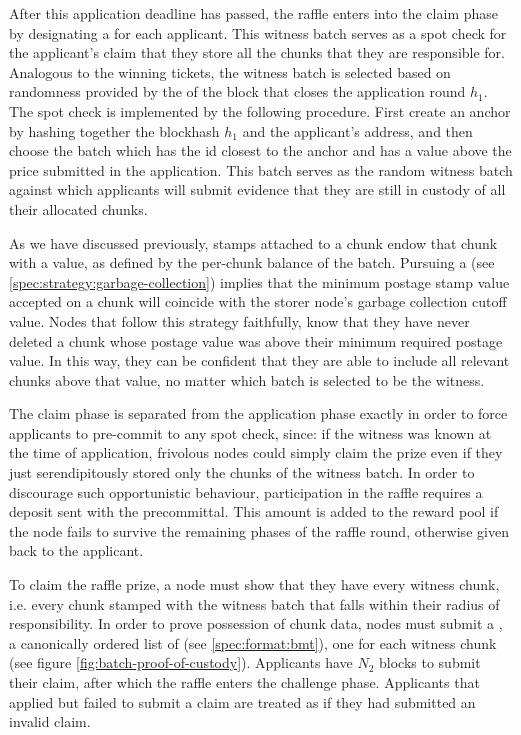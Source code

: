 After this application deadline has passed, the raffle enters into the claim phase by designating a  for each applicant. This witness batch serves as a spot check for the applicant's claim that they store all the chunks that they are responsible for. Analogous to the winning tickets, the witness batch is selected based on randomness provided by the  of the block that closes the application round $h_1$.  The spot check is implemented  by the following procedure. First create an anchor by hashing together the blockhash $h_1$ and the applicant's address, and then choose the batch which has the id closest to the anchor and has a value above the price submitted in the application. This batch serves as the random witness batch against which applicants will submit evidence that they are still in custody of all their allocated chunks. 

As we have discussed previously, stamps attached to a chunk endow that chunk with a value, as defined by the per-chunk balance of the batch. Pursuing a  (see \ref{spec:strategy:garbage-collection}) implies that the minimum postage stamp value accepted on a chunk will coincide with the storer node's garbage collection cutoff value. Nodes that follow this strategy faithfully, know that they have never deleted a chunk whose postage value was above their minimum required postage value. In this way, they can be confident that they are able to include all relevant chunks above that value, no matter which batch is selected to be the witness.

The claim phase is separated from the application phase exactly in order to force applicants to pre-commit to any spot check, since: if the witness was known at the time of application, frivolous nodes could simply claim the prize even if they just serendipitously stored only the chunks of the witness batch.  In  order to discourage such     opportunistic   behaviour, participation in the raffle requires a deposit sent  with the precommittal. This amount is added to the reward pool if the node fails to survive the remaining phases of  the raffle round, otherwise given back to the applicant.

To claim the raffle prize, a node must show that they have every witness chunk, i.e. every chunk stamped with the witness batch that falls within their radius of responsibility. In order to prove possession of chunk data, nodes must submit a , a canonically ordered list of  (see \ref{spec:format:bmt}), one for each witness chunk (see figure 
\ref{fig:batch-proof-of-custody}). Applicants have $N_2$ blocks to submit their claim, after which the raffle enters the challenge phase. Applicants that applied but failed to submit a claim are treated as if they had submitted an invalid claim.   


